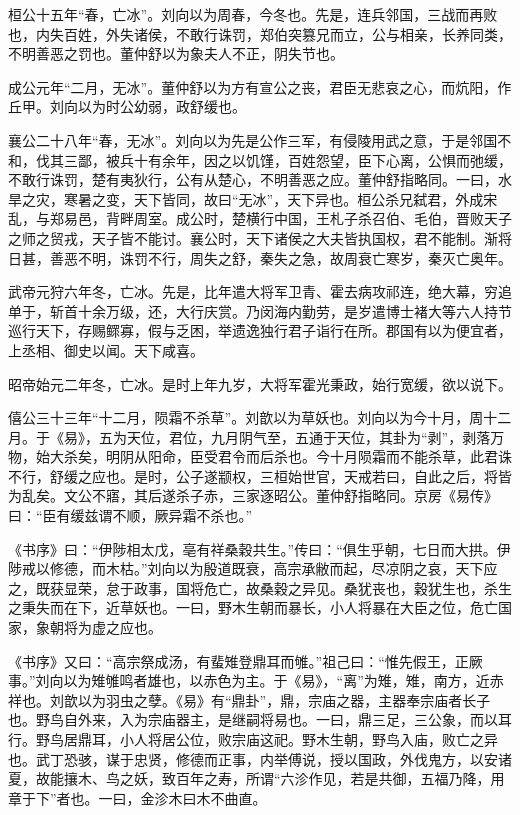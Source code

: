 \documentclass[]{article}
\begin{document}
桓公十五年``春，亡冰''。刘向以为周春，今冬也。先是，连兵邻国，三战而再败也，内失百姓，外失诸侯，不敢行诛罚，郑伯突篡兄而立，公与相亲，长养同类，不明善恶之罚也。董仲舒以为象夫人不正，阴失节也。

成公元年``二月，无冰''。董仲舒以为方有宣公之丧，君臣无悲哀之心，而炕阳，作丘甲。刘向以为时公幼弱，政舒缓也。

襄公二十八年``春，无冰''。刘向以为先是公作三军，有侵陵用武之意，于是邻国不和，伐其三鄙，被兵十有余年，因之以饥馑，百姓怨望，臣下心离，公惧而弛缓，不敢行诛罚，楚有夷狄行，公有从楚心，不明善恶之应。董仲舒指略同。一曰，水旱之灾，寒暑之变，天下皆同，故曰``无冰''，天下异也。桓公杀兄弑君，外成宋乱，与郑易邑，背畔周室。成公时，楚横行中国，王札子杀召伯、毛伯，晋败天子之师之贸戎，天子皆不能讨。襄公时，天下诸侯之大夫皆执国权，君不能制。渐将日甚，善恶不明，诛罚不行，周失之舒，秦失之急，故周衰亡寒岁，秦灭亡奥年。

武帝元狩六年冬，亡冰。先是，比年遣大将军卫青、霍去病攻祁连，绝大幕，穷追单于，斩首十余万级，还，大行庆赏。乃闵海内勤劳，是岁遣博士褚大等六人持节巡行天下，存赐鳏寡，假与乏困，举遗逸独行君子诣行在所。郡国有以为便宜者，上丞相、御史以闻。天下咸喜。

昭帝始元二年冬，亡冰。是时上年九岁，大将军霍光秉政，始行宽缓，欲以说下。

僖公三十三年``十二月，陨霜不杀草''。刘歆以为草妖也。刘向以为今十月，周十二月。于《易》，五为天位，君位，九月阴气至，五通于天位，其卦为``剥''，剥落万物，始大杀矣，明阴从阳命，臣受君令而后杀也。今十月陨霜而不能杀草，此君诛不行，舒缓之应也。是时，公子遂颛权，三桓始世官，天戒若曰，自此之后，将皆为乱矣。文公不寤，其后遂杀子赤，三家逐昭公。董仲舒指略同。京房《易传》曰：``臣有缓兹谓不顺，厥异霜不杀也。''

《书序》曰：``伊陟相太戊，亳有祥桑穀共生。''传曰：``俱生乎朝，七日而大拱。伊陟戒以修德，而木枯。''刘向以为殷道既衰，高宗承敝而起，尽凉阴之哀，天下应之，既获显荣，怠于政事，国将危亡，故桑穀之异见。桑犹丧也，穀犹生也，杀生之秉失而在下，近草妖也。一曰，野木生朝而暴长，小人将暴在大臣之位，危亡国家，象朝将为虚之应也。

《书序》又曰：``高宗祭成汤，有蜚雉登鼎耳而雊。''祖己曰：``惟先假王，正厥事。''刘向以为雉雊鸣者雄也，以赤色为主。于《易》，``离''为雉，雉，南方，近赤祥也。刘歆以为羽虫之孽。《易》有``鼎卦''，鼎，宗庙之器，主器奉宗庙者长子也。野鸟自外来，入为宗庙器主，是继嗣将易也。一曰，鼎三足，三公象，而以耳行。野鸟居鼎耳，小人将居公位，败宗庙这祀。野木生朝，野鸟入庙，败亡之异也。武丁恐骇，谋于忠贤，修德而正事，内举傅说，授以国政，外伐鬼方，以安诸夏，故能攘木、鸟之妖，致百年之寿，所谓``六沴作见，若是共御，五福乃降，用章于下''者也。一曰，金沴木曰木不曲直。
\end{document}
